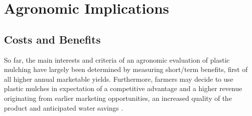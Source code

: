\section{Agronomic Implications}
\label{sec:plastic-mulching:agronomic-implications}

\subsection{Costs and Benefits}

So far, the main interests and criteria of an agronomic evaluation of plastic mulching have largely been determined by measuring short\-/term benefits, first of all higher annual marketable yields. Furthermore, farmers may decide to use plastic mulches in expectation of a competitive advantage and a higher revenue originating from earlier marketing opportunities, an increased quality of the product and anticipated water savings \citep{IngmanAgricultural2015,JohnsonWeed2005,KwabiahPerformance2003}.

